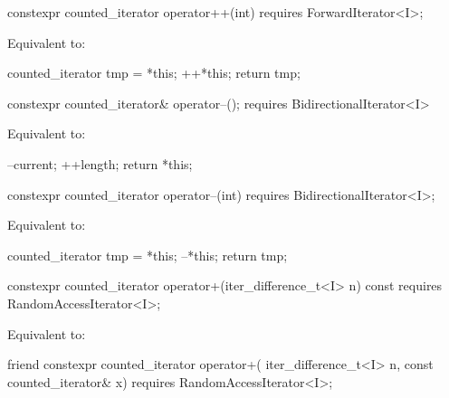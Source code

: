 \documentclass{wg21}
\begin{document}
%
\begin{itemdecl}
	constexpr counted_iterator operator++(int)
	requires ForwardIterator<I>;
\end{itemdecl}

\begin{itemdescr}
	\pnum
	\effects Equivalent to:
	\begin{codeblock}
		counted_iterator tmp = *this;
		++*this;
		return tmp;
	\end{codeblock}
\end{itemdescr}

%
\begin{itemdecl}
	constexpr counted_iterator& operator--();
	requires BidirectionalIterator<I>
\end{itemdecl}

\begin{itemdescr}
	\pnum
	\effects Equivalent to:
	\begin{codeblock}
		--current;
		++length;
		return *this;
	\end{codeblock}
\end{itemdescr}

%
\begin{itemdecl}
	constexpr counted_iterator operator--(int)
	requires BidirectionalIterator<I>;
\end{itemdecl}

\begin{itemdescr}
	\pnum
	\effects Equivalent to:
	\begin{codeblock}
		counted_iterator tmp = *this;
		--*this;
		return tmp;
	\end{codeblock}
\end{itemdescr}

%
\begin{itemdecl}
	constexpr counted_iterator operator+(iter_difference_t<I> n) const
	requires RandomAccessIterator<I>;
\end{itemdecl}

\begin{itemdescr}
	\pnum
	\effects Equivalent to: 
\end{itemdescr}

%
\begin{itemdecl}
	friend constexpr counted_iterator operator+(
	iter_difference_t<I> n, const counted_iterator& x)
	requires RandomAccessIterator<I>;
\end{itemdecl}
\end{document}

